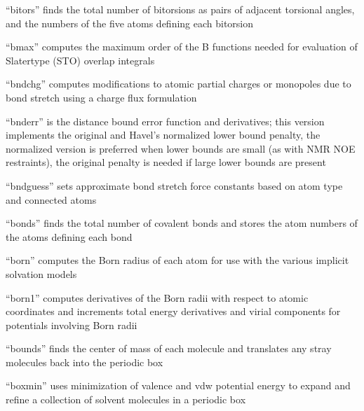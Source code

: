\documentclass[letterpaper,11pt,english]{sphinxmanual}
\begin{document}

“bitors” finds the total number of bitorsions as pairs
of adjacent torsional angles, and the numbers of the five
atoms defining each bitorsion


“bmax” computes the maximum order of the B functions needed
for evaluation of Slater\sphinxhyphen{}type (STO) overlap integrals


“bndchg” computes modifications to atomic partial charges or
monopoles due to bond stretch using a charge flux formulation


“bnderr” is the distance bound error function and derivatives;
this version implements the original and Havel’s normalized
lower bound penalty, the normalized version is preferred when
lower bounds are small (as with NMR NOE restraints), the
original penalty is needed if large lower bounds are present


“bndguess” sets approximate bond stretch force constants based
on atom type and connected atoms


“bonds” finds the total number of covalent bonds and
stores the atom numbers of the atoms defining each bond


“born” computes the Born radius of each atom for use with
the various implicit solvation models


“born1” computes derivatives of the Born radii with respect
to atomic coordinates and increments total energy derivatives
and virial components for potentials involving Born radii


“bounds” finds the center of mass of each molecule and
translates any stray molecules back into the periodic box


“boxmin” uses minimization of valence and vdw potential energy
to expand and refine a collection of solvent molecules in a
periodic box
\end{document}

